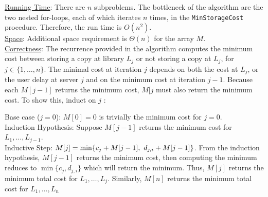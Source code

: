 \documentclass[twoside,11pt]{homework}
\begin{document}
\noindent

\noindent
\underline{Running Time}:  There are $n$ subproblems. The bottleneck of the algorithm are the two nested for-loops, each of which iterates $n$ times, in the \texttt{MinStorageCost} procedure.  Therefore,  the run time is $O(n^2)$.  \\

\noindent
\underline{Space}:  Additional space requirement is $\Theta(n)$ for the array $M$.  \\

\noindent
\underline{Correctness}:  The recurrence provided in the algorithm computes the minimum cost between storing a copy at library $L_j$ or not storing a copy at $L_j$, for $j \in \{1, \dots, n\}$.  The minimal cost at iteration $j$ depends on both the cost at $L_j$, or the user delay at server $j$ and on the minimum cost at iteration $j-1$.  Because each $M[j-1]$ returns the minimum cost, $M[j$ must also return the minimum cost.  To show this,  induct on $j$ :

\noindent
Base case ($j = 0$):  $M[0] = 0$ is trivially the minimum cost for $j=0$.  \\
Induction Hypothesis:  Suppose $M[j-1]$ returns the minimum cost for $L_1, \dots, L_{j-1}$. \\
Inductive Step:  $M[j] = \mathlarger{\min \{c_j + M[j-1], \ d_{j, i} + M[j-1] \} }$.  From the induction hypothesis, $M[j-1]$ returns the minimum cost, then computing the minimum reduces to $\min \{c_j, d_{j, i}\}$ which will return the minimum. Thus, $M[j]$ returns the minimum total cost for $L_1, \dots , L_j$.  Similarly, $M[n]$ returns the minimum total cost for $L_1, \dots , L_n$
\end{document}
